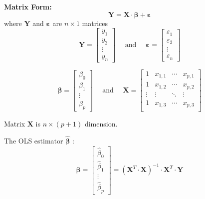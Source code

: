 \documentclass[12pt]{article}
\begin{document}
{\textbf {Matrix Form:}}
\begin{equation*}
\bm{Y} = \bm{X}\cdot \bm{\beta} + \bm{\varepsilon}
\end{equation*}
where $ \bm{Y} $ and $ \bm{\varepsilon} $ are $ n  \times 1 $ matrices
\begin{equation*}
\bm{Y} = 
\begin{bmatrix}
y_1\\y_2\\ \vdots  \\y_{n}
\end{bmatrix}
\quad
\text{ and }
\quad
\bm{\varepsilon} = 
\begin{bmatrix}
\varepsilon_1\\\varepsilon_2\\ \vdots  \\\varepsilon_{n}
\end{bmatrix}
\end{equation*}


\begin{equation*}
\bm{\beta} = 
\begin{bmatrix}
\beta_0\\\beta_1\\ \vdots \\\beta_{p}
\end{bmatrix}
\quad
\text{ and }
\quad
\bm{X} = 
\begin{bmatrix}
1 & x_{1,1} &\cdots&x_{p,1}\\
1 & x_{1,2} &\cdots&x_{p,2}\\
\vdots & \vdots &\ddots &\vdots \\
1 & x_{1,3} &\cdots&x_{p,3}\\
\end{bmatrix}
\end{equation*}


Matrix $ \bm{X} $ is $ n  \times (p + 1) $ dimension.


The OLS estimator $  \widehat{\bm{\beta}} $ :
\begin{equation*}
 \widehat{\bm{\beta}} = 
 \begin{bmatrix}
  \widehat{\beta}_{0}\\  \widehat{\beta}_{1}\\ \vdots \\  
	\widehat{\beta}_{p}
 \end{bmatrix}
 = (\bm{X}^{T}\cdot \bm{X})^{ - 1}\cdot \bm{X}^{T}\cdot \bm{Y}
\end{equation*}
\end{document}
